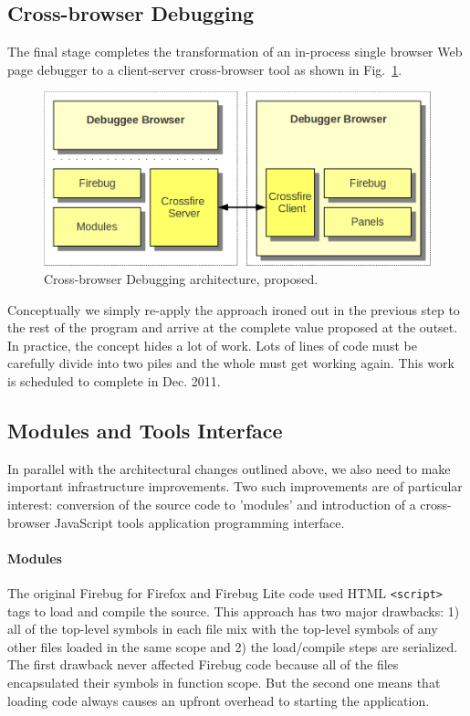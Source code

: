\subsection{Cross-browser Debugging}
The final stage completes the transformation of an in-process single browser Web
page debugger to a client-server cross-browser tool as shown in
Fig.~\ref{fig:crossbrowser}. \begin{figure}[htp]
  \includegraphics  [width = 86 mm] {figures/crossbrowser.png}
  \caption{Cross-browser Debugging architecture, proposed.}
 \label{fig:crossbrowser}
\end{figure}
Conceptually we simply re-apply the approach ironed out in the previous step to
the rest of the program and arrive at the complete value proposed at the outset.
In practice, the concept hides a lot of work. Lots of lines of code must be
carefully divide into two piles and the whole must get working again. This work
is scheduled to complete in Dec. 2011.

\subsection{Modules and Tools Interface}
In parallel with the architectural changes outlined above, we also need to make important infrastructure improvements.
Two such improvements are of particular interest: conversion of the source code to 'modules' and introduction of a cross-browser JavaScript tools application programming interface.

\paragraph{Modules} The original Firebug for Firefox and Firebug Lite code used HTML \texttt{<script>} tags to load and compile the source. This approach has two major drawbacks: 1) all of the top-level symbols in each file mix with the top-level symbols of any other files loaded in the same scope and 2) the load/compile steps are serialized. The first drawback never affected Firebug code because all of the files encapsulated their symbols in function scope. But the second one means that loading code always causes an upfront overhead to starting the application.

